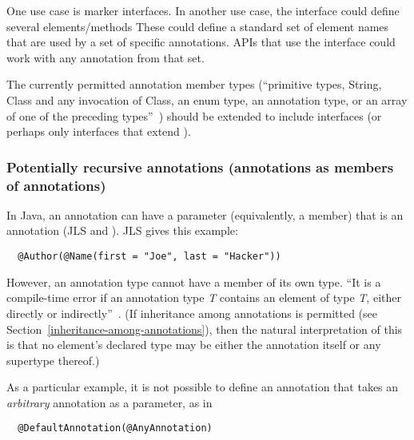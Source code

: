 \documentclass[10pt]{article}
\begin{document}
One use case is marker interfaces.
%
In another use case, the interface could define several elements/methods
These could define a standard set of element names that are used by a set
of specific annotations.  APIs that use the interface could work with any
annotation from that set.

The currently permitted annotation member types (``primitive types, String,
Class and any invocation of Class, an enum type, an annotation type, or an
array of one of the preceding types''~\cite[\S9.6]{GoslingJSB2005}) should
be extended to include interfaces (or perhaps only interfaces that extend
).






\subsubsection{Potentially recursive annotations (annotations as members of annotations)\label{annotations-as-members}\label{annotations-as-arguments}\label{recursive-annotations}}

In Java, an annotation can have a parameter (equivalently, a member) that is an
annotation (JLS
 and
).
JLS
gives this example:

\begin{Verbatim}
  @Author(@Name(first = "Joe", last = "Hacker"))
\end{Verbatim}

However, an annotation type cannot have a member of its own type.
``It is a compile-time error if an annotation type \emph{T} contains an
element of type \emph{T}, either directly or
indirectly''~\cite[\S9.6]{GoslingJSB2005}.
(If inheritance among annotations is permitted (see
Section~\ref{inheritance-among-annotations}), then the natural
interpretation of this is that no element's declared type may be either the
annotation itself or any supertype thereof.)

As a particular example, it is not possible to define an annotation that
takes an \emph{arbitrary} annotation as a parameter, as in

\begin{Verbatim}
  @DefaultAnnotation(@AnyAnnotation)
\end{Verbatim}
\end{document}
